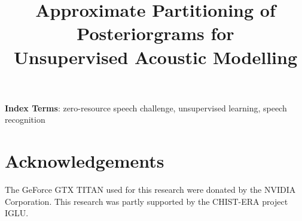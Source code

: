 \documentclass[a4paper]{article}
\title{Approximate Partitioning of Posteriorgrams for\\Unsupervised Acoustic Modelling}
\begin{document}
\maketitle
% 
\begin{abstract}

\end{abstract}
\noindent\textbf{Index Terms}: zero-resource speech challenge, unsupervised learning, speech recognition







\section{Acknowledgements}
The GeForce GTX TITAN used for this research were donated by the NVIDIA Corporation. This research was partly supported by the CHIST-ERA project IGLU.

\clearpage


\printbibliography[heading=bibnumbered]
%

%
\end{document}
